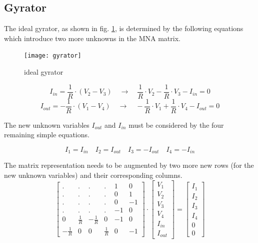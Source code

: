 \subsection{Gyrator}

The ideal gyrator, as shown in fig. \ref{fig:gyrator}, is determined
by the following equations which introduce two more unknowns in the
MNA matrix.

\begin{figure}[ht]
\begin{center}
\texttt{[image: gyrator]}
\end{center}
\caption{ideal gyrator}
\label{fig:gyrator}
\end{figure}
\FloatBarrier

\begin{equation}
I_{in} = \frac{1}{R}\cdot\left(V_{2} - V_{3}\right)
\quad \rightarrow \quad
\frac{1}{R}\cdot V_{2} - \frac{1}{R}\cdot V_{3} - I_{in} = 0
\end{equation}
\begin{equation}
I_{out} = -\frac{1}{R}\cdot\left(V_{1} - V_{4}\right)
\quad \rightarrow \quad
-\frac{1}{R}\cdot V_{1} + \frac{1}{R}\cdot V_{4} - I_{out} = 0
\label{eq:gyrator}
\end{equation}

The new unknown variables $I_{out}$ and $I_{in}$ must be considered by
the four remaining simple equations.

\begin{equation}
I_{1} = I_{in} \quad I_{2} = I_{out} \quad I_{3} = -I_{out} \quad I_{4} = -I_{in}
\end{equation}

The matrix representation needs to be augmented by two more new rows
(for the new unknown variables) and their corresponding columns.
\begin{equation}
\label{eq:gyratorStamp}
\begin{bmatrix}
.&.&.&.& 1 & 0\\
.&.&.&.& 0 & 1\\
.&.&.&.& 0 & -1\\
.&.&.&.& -1 & 0\\
0 & \frac{1}{R} & -\frac{1}{R} & 0 & -1 & 0\\
-\frac{1}{R} & 0 & 0 & \frac{1}{R} & 0 & -1
\end{bmatrix}
\cdot
\begin{bmatrix}
V_{1}\\
V_{2}\\
V_{3}\\
V_{4}\\
I_{in}\\
I_{out}
\end{bmatrix}
=
\begin{bmatrix}
I_{1}\\
I_{2}\\
I_{3}\\
I_{4}\\
0\\
0
\end{bmatrix}
\end{equation}

